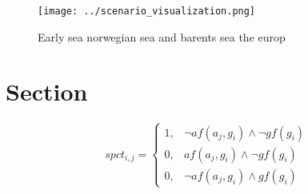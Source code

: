 \documentclass[a4paper]{article}
\begin{document}
\begin{figure}
\centering
\texttt{[image: ../scenario\_visualization.png]}
\caption{Early sea norwegian sea and barents sea the europ
}
\end{figure}
 
\section{Section}

\begin{equation}
spct_{i,j} =
\begin{cases}
1, & \text{$\neg af(a_j,g_i) \wedge \neg gf(g_i)$}\\
0, & \text{$af(a_j,g_i) \wedge \neg gf(g_i)$}\\
0, & \text{$\neg af(a_j,g_i) \wedge gf(g_i)$}
\end{cases}
\end{equation}
\end{document}
